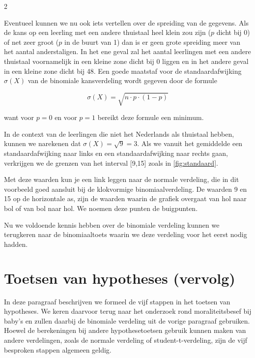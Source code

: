 \begin{multicols}{2}

Eventueel kunnen we nu ook iets vertellen over de spreiding van de gegevens. Als de kans op een leerling met een andere thuistaal heel klein zou zijn ($p$ dicht bij 0) of net zeer groot ($p$ in de buurt van 1) dan is er geen grote spreiding meer van het aantal anderstaligen. In het ene geval zal het aantal leerlingen met een andere thuistaal voornamelijk in een kleine zone dicht bij 0 liggen en in het andere geval in een kleine zone dicht bij 48. Een goede maatstaf voor de standaardafwijking $\sigma(X)$ van de binomiale kansverdeling wordt gegeven door de formule

\[\sigma(X)=\sqrt{n\cdot p\cdot(1-p)}\]

want voor $p=0$ en voor $p=1$ bereikt deze formule een minimum. 

In de context van de leerlingen die niet het Nederlands als thuistaal hebben, kunnen we narekenen dat $\sigma(X)=\sqrt{9}=3$. Als we vanuit het gemiddelde een standaardafwijking naar links en een standaardafwijking naar rechts gaan, verkrijgen we de grenzen van het interval [9,15] zoals in \autoref{fig:standaard}.


Met deze waarden kun je een link leggen naar de normale verdeling, die in dit voorbeeld goed aansluit bij de klokvormige binomiaalverdeling. De waarden 9 en 15 op de horizontale as, zijn de waarden waarin de grafiek overgaat van hol naar bol of van bol naar hol. We noemen deze punten de buigpunten.


Nu we voldoende kennis hebben over de binomiale verdeling kunnen we terugkeren naar de binomiaaltoets waarin we deze verdeling voor het eerst nodig hadden.

\section{Toetsen van hypotheses (vervolg)} \label{S_4}
In deze paragraaf beschrijven we formeel de vijf stappen in het toetsen van hypotheses. We keren daarvoor terug naar het onderzoek rond moraliteitsbesef bij baby's en zullen daarbij de binomiale verdeling uit de vorige paragraaf gebruiken. Hoewel de berekeningen bij andere hypothesetoetsen gebruik kunnen maken van andere verdelingen, zoals de normale verdeling of student-t-verdeling, zijn de vijf besproken stappen algemeen geldig.


\end{multicols}

